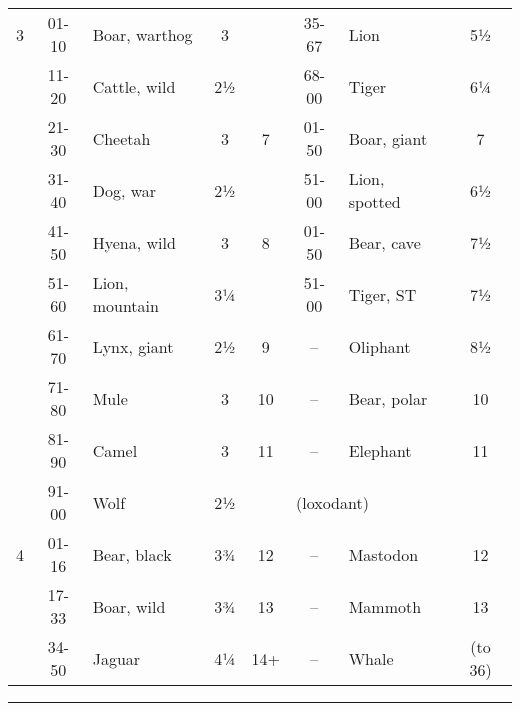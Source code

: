 \documentclass[../main.tex]{subfiles}
\begin{document}
\begin{multicols}{2}
\begin{minipage}[H]{0.75\textwidth}
\begin{table}[H]
{\begin{tabular}{cclccclc}
3 & 01-10 & Boar, warthog & 3 &  & 35-67 & Lion & 5½ \\
 & 11-20 & Cattle, wild & 2½ &  & 68-00 & Tiger & 6¼ \\
 & 21-30 & Cheetah & 3 & 7 & 01-50 & Boar, giant & 7 \\
 & 31-40 & Dog, war & 2½ &  & 51-00 & Lion, spotted & 6½ \\
 & 41-50 & Hyena, wild & 3 & 8 & 01-50 & Bear, cave & 7½ \\
 & 51-60 & Lion, mountain & 3¼ &  & 51-00 & Tiger, ST & 7½ \\
 & 61-70 & Lynx, giant & 2½ & 9 & -- & Oliphant & 8½ \\
 & 71-80 & Mule & 3 & 10 & -- & Bear, polar & 10 \\
 & 81-90 & Camel & 3 & 11 & -- & Elephant & 11 \\
 & 91-00 & Wolf & 2½ &  & \multicolumn{3}{l}{(loxodant)} \\
4 & 01-16 & Bear, black & 3¾ & 12 & -- & Mastodon & 12 \\
 & 17-33 & Boar, wild & 3¾ & 13 & -- & Mammoth & 13 \\
 & 34-50 & Jaguar & 4¼ & 14+ & -- & Whale & (to 36)
\end{tabular}%
}
\end{table}
\hrule
\end{minipage}
\end{multicols}
\end{document}
